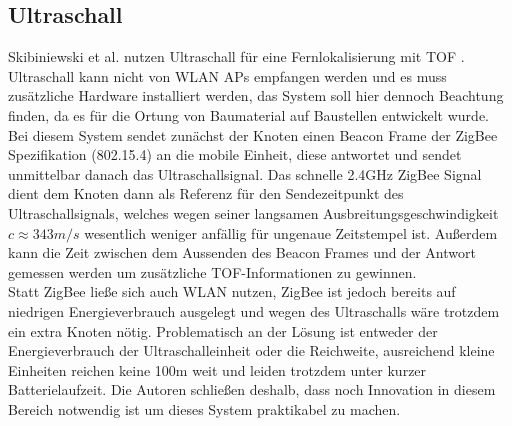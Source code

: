 \subsection{Ultraschall}
Skibiniewski et al. nutzen Ultraschall für eine Fernlokalisierung mit TOF \cite{skibniewski2009simulation}.
Ultraschall kann nicht von WLAN APs empfangen werden und es muss zusätzliche Hardware installiert werden, das System soll hier dennoch Beachtung finden, da es für die Ortung von Baumaterial auf Baustellen entwickelt wurde.\\
Bei diesem System sendet zunächst der Knoten einen Beacon Frame der ZigBee Spezifikation (802.15.4) an die mobile Einheit, diese antwortet und sendet unmittelbar danach das Ultraschallsignal.
Das schnelle 2.4GHz ZigBee Signal dient dem Knoten dann als Referenz für den Sendezeitpunkt des Ultraschallsignals, welches wegen seiner langsamen Ausbreitungsgeschwindigkeit $c \approx 343m/s$ wesentlich weniger anfällig für ungenaue Zeitstempel ist. 
Außerdem kann die Zeit zwischen dem Aussenden des Beacon Frames und der Antwort gemessen werden um zusätzliche TOF-Informationen zu gewinnen. \\
Statt ZigBee ließe sich auch WLAN nutzen, ZigBee ist jedoch bereits auf niedrigen Energieverbrauch ausgelegt und wegen des Ultraschalls wäre trotzdem ein extra Knoten nötig.
Problematisch an der Lösung ist entweder der Energieverbrauch der Ultraschalleinheit oder die Reichweite, ausreichend kleine Einheiten reichen keine 100m weit und leiden trotzdem unter kurzer Batterielaufzeit.
Die Autoren schließen deshalb, dass noch Innovation in diesem Bereich notwendig ist um dieses System praktikabel zu machen.

